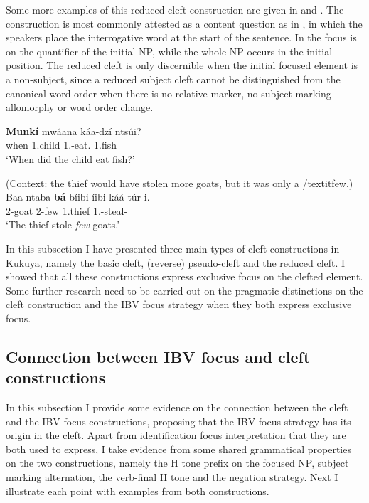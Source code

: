 \documentclass[output=paper,colorlinks,citecolor=brown,
]{langscibook}
\begin{document}
Some more examples of this reduced cleft construction are given in  and . The construction is most commonly attested as a content question as in , in which the speakers place the interrogative word at the start of the sentence. In  the focus is on the quantifier of the initial NP, while the whole NP occurs in the initial position. The reduced cleft is only discernible when the initial focused element is a non-subject, since a reduced subject cleft cannot be distinguished from the canonical word order when there is no relative marker, no subject marking allomorphy or word order change.
\begin{exe}
\ex
\label{143}
\gll
\textbf{Munkí} mwáana káa-dzí ntsúi?\\
when 1.child 1\Sm{}.\Pst{}-eat.\Pst{} 1.fish\\
\trans ‘When did the child eat fish?’

\end{exe}
\begin{exe}
\ex
\label{144}
 (Context: the thief would have stolen more goats, but it was only a /textit{few}.)\\
\gll
Baa-ntaba \textbf{bá}-bíibi {\textltailm}íibi káá-túr-i.\\
2-goat 2-few 1.thief 1\Sm{}.\Pst{}-steal-\Pst{}\\
\trans ‘The thief stole \textit{few} goats.’

\end{exe}
In this subsection I have presented three main types of cleft constructions in Kukuya, namely the basic cleft, (reverse) pseudo-cleft and the reduced cleft. I showed that all these constructions express exclusive focus on the clefted element. Some further research need to be carried out on the pragmatic distinctions on the cleft construction and the IBV focus strategy when they both express exclusive focus. 
\subsection{Connection between IBV focus and cleft constructions}\label{teke:sec:5.2}
In this subsection I provide some evidence on the connection between the cleft and the IBV focus constructions, proposing that the IBV focus strategy has its origin in the cleft. Apart from identification focus interpretation that they are both used to express, I take evidence from some shared grammatical properties on the two constructions, namely the H tone prefix on the focused NP, subject marking alternation, the verb-final H tone and the negation strategy. Next I illustrate each point with examples from both constructions.
\end{document}
